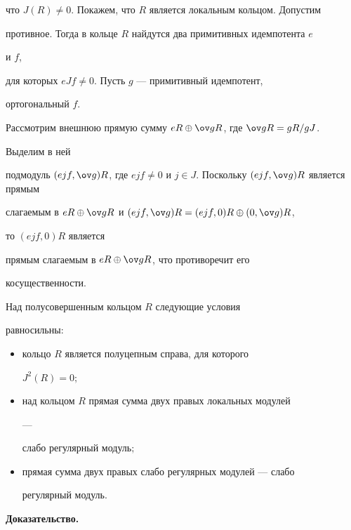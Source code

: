 что $J(R)\ne0$. Покажем, что $R$ является локальным кольцом. Допустим 


противное. Тогда в кольце $R$ найдутся два примитивных идемпотента $e$ 


и $f$, 


для которых $eJf\ne0$. Пусть $g$ --- примитивный идемпотент, 


ортогональный $f$. 


Рассмотрим внешнюю прямую сумму $eR\oplus\ov gR$, где $\ov gR=gR/gJ$. 


Выделим в ней 


подмодуль $(ejf,\ov g)R$, где $ejf\ne0$ и $j\in J$. Поскольку $(ejf,\ov 


g)R$ является прямым 


слагаемым в $eR\oplus\ov gR$ и $(ejf,\ov g)R=(ejf,0)R\oplus(0,\ov g)R$, 


то $(ejf,0)R$ является 


прямым слагаемым в $eR\oplus\ov gR$, что противоречит его 


косущественности. 


 


\begin{thm} 


Над полусовершенным кольцом $R$ следующие условия 


равносильны\/${:}$ 


\begin{itemize} 


\item[1)] кольцо $R$ является полуцепным справа, для которого 


$J^2(R)=0;$ 


\item[2)] над кольцом $R$ прямая сумма двух правых локальных модулей 


--- 


слабо регулярный модуль\/$;$ 


\item[3)] прямая сумма двух правых слабо регулярных модулей --- слабо 


регулярный модуль. 


\end{itemize} 


\end{thm} 


 


 


{\bf Доказательство.} 


